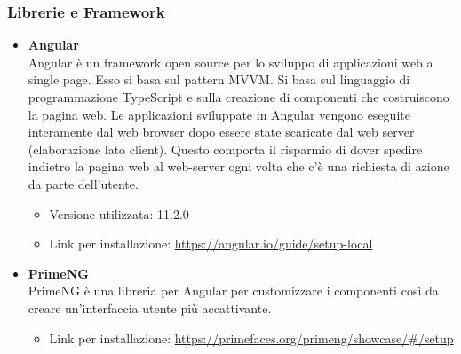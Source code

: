 \subsubsection{Librerie e Framework}

\begin{itemize}
	\item \textbf{Angular} \\
	Angular è un framework open source per lo sviluppo di applicazioni web a single page. Esso si basa sul pattern MVVM. Si basa sul linguaggio di programmazione TypeScript e sulla creazione di componenti che costruiscono la pagina web. Le applicazioni sviluppate in Angular vengono eseguite interamente dal web browser dopo essere state scaricate dal web server (elaborazione lato client). Questo comporta il risparmio di dover spedire indietro la pagina web al web-server ogni volta che c'è una richiesta di azione da parte dell'utente.
	\begin{itemize}
		\item Versione utilizzata: 11.2.0
		\item Link per installazione: \url{https://angular.io/guide/setup-local}
	\end{itemize}
 	\item \textbf{PrimeNG} \\
 	PrimeNG è una libreria per Angular per customizzare i componenti così da creare un'interfaccia utente più accattivante.
	 \begin{itemize}
		\item Link per installazione: \url{https://primefaces.org/primeng/showcase/#/setup}
	\end{itemize}

	
\end{itemize}